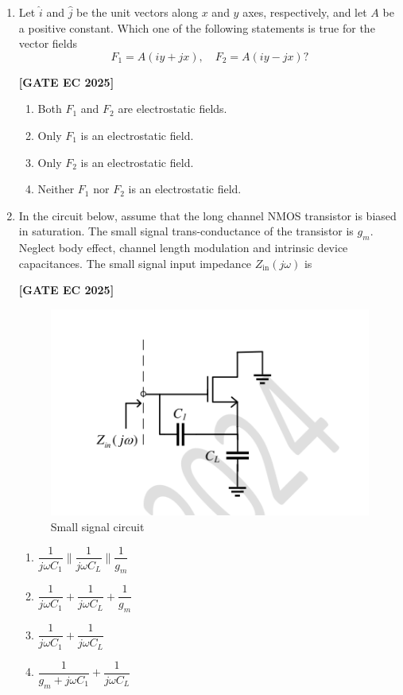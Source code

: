 \documentclass[12pt]{article}
\begin{document}
\begin{enumerate}[leftmargin=1.5em, label=\textbf{Q.\arabic*}., itemsep=2em]
\item Let $\hat{i}$ and $\hat{j}$ be the unit vectors along $x$ and $y$ axes, respectively, and let $A$ be a positive constant. Which one of the following statements is true for the vector fields
\[
F_1 = A(i y + j x), \quad F_2 = A(i y - j x)?
\]

\noindent \textbf{[GATE EC 2025]}
\begin{multicols}{2}
\begin{enumerate}
    \item Both $F_1$ and $F_2$ are electrostatic fields.
    \item Only $F_1$ is an electrostatic field.
    \item Only $F_2$ is an electrostatic field.
    \item Neither $F_1$ nor $F_2$ is an electrostatic field.
\end{enumerate}
\end{multicols}

\item In the circuit below, assume that the long channel NMOS transistor is biased in saturation. The small signal trans-conductance of the transistor is $g_m$. Neglect body effect, channel length modulation and intrinsic device capacitances. The small signal input impedance $Z_{\text{in}}(j\omega)$ is

\noindent \textbf{[GATE EC 2025]}
\begin{figure}[H]\centering
\includegraphics[width=0.65\columnwidth]{figs/q17.png}
\caption{Small signal circuit}
\label{fig:q17}
\end{figure}
\begin{multicols}{2}
\begin{enumerate}
    \item $\dfrac{1}{j\omega C_1} \parallel \dfrac{1}{j\omega C_L} \parallel \dfrac{1}{g_m}$
    \item $\dfrac{1}{j\omega C_1} + \dfrac{1}{j\omega C_L} + \dfrac{1}{g_m}$
    \item $\dfrac{1}{j\omega C_1} + \dfrac{1}{j\omega C_L}$
    \item $\dfrac{1}{g_m + j\omega C_1} + \dfrac{1}{j\omega C_L}$
\end{enumerate}
\end{multicols}


\end{enumerate}
\end{document}
